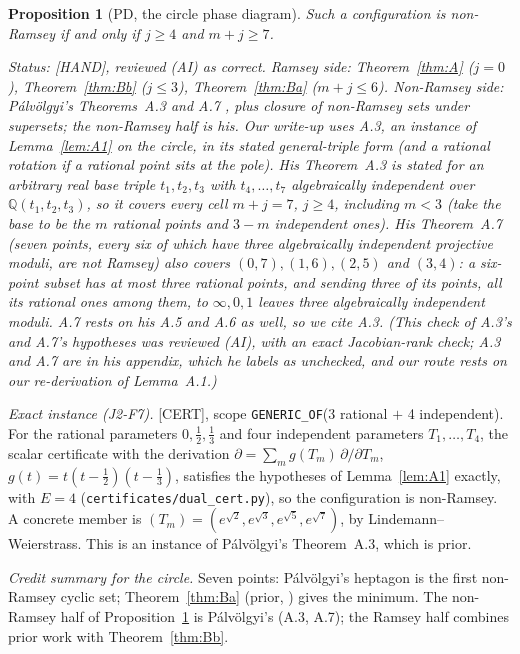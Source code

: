 \documentclass[11pt]{amsart}
\newcommand{\st}[1]{\textsf{[#1]}}
\newcommand{\Q}{\mathbb{Q}}
\theoremstyle{plain}
\newtheorem{proposition}[theorem]{Proposition}
\theoremstyle{definition}
\begin{document}
\begin{proposition}[PD, the circle phase diagram]\label{prop:PD}
Such a configuration is non-Ramsey if and only if $j\ge4$ and $m+j\ge7$.

\smallskip\noindent\emph{Status:} \st{HAND}, reviewed (AI) as correct. Ramsey side:
Theorem~\ref{thm:A} ($j=0$), Theorem~\ref{thm:Bb} ($j\le3$), Theorem~\ref{thm:Ba} ($m+j\le6$).
Non-Ramsey side: P\'alv\"olgyi's Theorems~A.3 and A.7 \cite{Palvolgyi}, plus closure of non-Ramsey sets
under supersets; the non-Ramsey half is his. Our write-up uses A.3, an instance of
Lemma~\ref{lem:A1} on the circle, in its stated general-triple form (and a rational rotation if a
rational point sits at the pole). His Theorem~A.3 is stated for an arbitrary real base triple
$t_1,t_2,t_3$ with $t_4,\dots,t_7$ algebraically independent over $\Q(t_1,t_2,t_3)$, so it covers every
cell $m+j=7$, $j\ge4$, including $m<3$ (take the base to be the $m$ rational points and $3-m$
independent ones). His Theorem~A.7 (seven points, every six of which have three algebraically
independent projective moduli, are not Ramsey) also covers $(0,7),(1,6),(2,5)$ and $(3,4)$: a
six-point subset has at most three rational points, and sending three of its points, all its rational
ones among them, to $\infty,0,1$ leaves three algebraically independent moduli. A.7 rests on his A.5
and A.6 as well, so we cite A.3. (This check of A.3's and A.7's hypotheses was reviewed (AI), with an
exact Jacobian-rank check; A.3 and A.7 are in his appendix, which he labels as unchecked, and our route
rests on our re-derivation of Lemma~A.1.)
\end{proposition}

\noindent\emph{Exact instance (J2-F7).} \st{CERT}, scope
\texttt{GENERIC\_OF}(3 rational $+$ 4 independent). For the rational parameters $0,\tfrac12,\tfrac13$
and four independent parameters $T_1,\dots,T_4$, the scalar certificate with the derivation $\partial=\sum_mg(T_m)\,\partial/\partial T_m$,
$g(t)=t(t-\tfrac12)(t-\tfrac13)$, satisfies the hypotheses of Lemma~\ref{lem:A1} exactly, with $E=4$
(\texttt{certificates/dual\_cert.py}), so the configuration is non-Ramsey. A concrete member is
$(T_m)=(e^{\sqrt2},e^{\sqrt3},e^{\sqrt5},e^{\sqrt7})$, by Lindemann--Weierstrass. This is an instance of
P\'alv\"olgyi's Theorem~A.3, which is prior.

\noindent\emph{Credit summary for the circle.} Seven points: P\'alv\"olgyi's heptagon \cite{Palvolgyi}
is the first non-Ramsey cyclic set; Theorem~\ref{thm:Ba} (prior, \cite{JDJones}) gives the minimum. The
non-Ramsey half of Proposition~\ref{prop:PD} is P\'alv\"olgyi's (A.3, A.7); the Ramsey half combines
prior work with Theorem~\ref{thm:Bb}.
\end{document}

